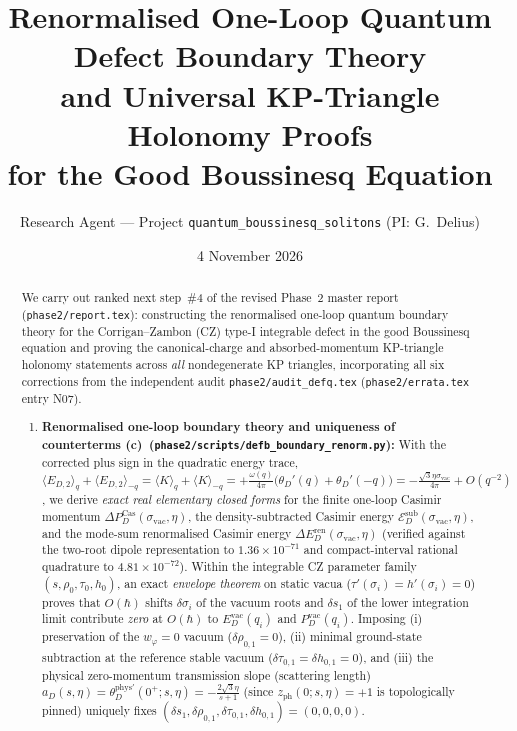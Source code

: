 \documentclass[11pt,a4paper]{article}
\title{\textbf{Renormalised One-Loop Quantum Defect Boundary Theory\\
and Universal KP-Triangle Holonomy Proofs\\
for the Good Boussinesq Equation}}
\author{Research Agent --- Project \texttt{quantum\_boussinesq\_solitons} (PI: G.~Delius)}
\date{4 November 2026}
\theoremstyle{remark}
\newcommand{\hb}{\hbar}
\newcommand{\Lc}{\textbf{(c)}}
\newcommand{\sren}{\texttt{phase2/\allowbreak scripts/\allowbreak defb\_\allowbreak boundary\_\allowbreak renorm.py}}
\begin{document}
\maketitle

\begin{abstract}
We carry out ranked next step~\#4 of the revised Phase~2 master report
(\texttt{phase2/report.tex}): constructing the renormalised one-loop quantum
boundary theory for the Corrigan--Zambon (CZ) type-I integrable defect in the
good Boussinesq equation and proving the canonical-charge and absorbed-momentum
KP-triangle holonomy statements across \emph{all} nondegenerate KP triangles,
incorporating all six corrections from the independent audit
\texttt{phase2/audit\_defq.tex} (\texttt{phase2/errata.tex} entry N07).
\begin{enumerate}
\item \textbf{Renormalised one-loop boundary theory and uniqueness of
counterterms \Lc\ (\sren):} With the corrected plus sign in the quadratic
energy trace,
$\langle E_{D,2}\rangle_q + \langle E_{D,2}\rangle_{-q} = \langle K\rangle_q + \langle K\rangle_{-q} = +\frac{\omega(q)}{4\pi}\big(\theta_D'(q)+\theta_D'(-q)\big) = -\frac{\sqrt{3}\eta\sigma_{\mathrm{vac}}}{4\pi} + O(q^{-2})$,
we derive \emph{exact real elementary closed forms} for the finite one-loop
Casimir momentum $\Delta P_D^{\mathrm{Cas}}(\sigma_{\mathrm{vac}},\eta)$, the
density-subtracted Casimir energy $\mathcal{E}_D^{\mathrm{sub}}(\sigma_{\mathrm{vac}},\eta)$,
and the mode-sum renormalised Casimir energy
$\Delta E_D^{\mathrm{ren}}(\sigma_{\mathrm{vac}},\eta)$ (verified against the
two-root dipole representation to $1.36\times 10^{-71}$ and compact-interval
rational quadrature to $4.81\times 10^{-72}$). Within the integrable CZ
parameter family $(s,\rho_0,\tau_0,h_0)$, an exact \emph{envelope theorem} on
static vacua ($\tau'(\sigma_i)=h'(\sigma_i)=0$) proves that $O(\hb)$ shifts
$\delta\sigma_i$ of the vacuum roots and $\delta s_1$ of the lower integration
limit contribute \emph{zero} at $O(\hb)$ to $E_D^{\mathrm{vac}}(q_i)$ and
$P_D^{\mathrm{vac}}(q_i)$. Imposing (i) preservation of the $w_\varphi=0$
vacuum ($\delta\rho_{0,1}=0$), (ii) minimal ground-state subtraction at the
reference stable vacuum ($\delta\tau_{0,1}=\delta h_{0,1}=0$), and (iii) the
physical zero-momentum transmission slope (scattering length)
$a_D(s,\eta) = \theta_D^{\mathrm{phys}\prime}(0^+;s,\eta) = -\frac{2\sqrt{3}\eta}{s+1}$
(since $z_{\mathrm{ph}}(0;s,\eta)=+1$ is topologically pinned) uniquely fixes
$(\delta s_1,\delta\rho_{0,1},\delta\tau_{0,1},\delta h_{0,1}) = (0,0,0,0)$.

\end{enumerate}
\end{abstract}
\end{document}
